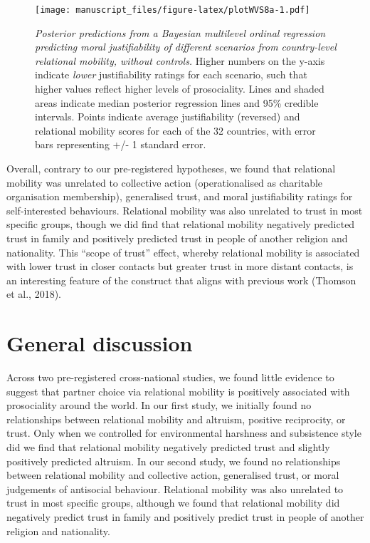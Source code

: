 \documentclass[english,man,floatsintext]{apa6}
\begin{document}
\begin{figure}
\centering
\texttt{[image: manuscript\_files/figure-latex/plotWVS8a-1.pdf]}
\caption{\label{fig:plotWVS8a}\emph{Posterior predictions from a Bayesian multilevel ordinal regression predicting moral justifiability of different scenarios from country-level relational mobility, without controls.} Higher numbers on the y-axis indicate \emph{lower} justifiability ratings for each scenario, such that higher values reflect higher levels of prosociality. Lines and shaded areas indicate median posterior regression lines and 95\% credible intervals. Points indicate average justifiability (reversed) and relational mobility scores for each of the 32 countries, with error bars representing +/- 1 standard error.}
\end{figure}

Overall, contrary to our pre-registered hypotheses, we found that relational mobility was unrelated to collective action (operationalised as charitable organisation membership), generalised trust, and moral justifiability ratings for self-interested behaviours. Relational mobility was also unrelated to trust in most specific groups, though we did find that relational mobility negatively predicted trust in family and positively predicted trust in people of another religion and nationality. This \enquote{scope of trust} effect, whereby relational mobility is associated with lower trust in closer contacts but greater trust in more distant contacts, is an interesting feature of the construct that aligns with previous work (Thomson et al., 2018).

\hypertarget{general-discussion}{%
\section{General discussion}\label{general-discussion}}

Across two pre-registered cross-national studies, we found little evidence to suggest that partner choice via relational mobility is positively associated with prosociality around the world. In our first study, we initially found no relationships between relational mobility and altruism, positive reciprocity, or trust. Only when we controlled for environmental harshness and subsistence style did we find that relational mobility negatively predicted trust and slightly positively predicted altruism. In our second study, we found no relationships between relational mobility and collective action, generalised trust, or moral judgements of antisocial behaviour. Relational mobility was also unrelated to trust in most specific groups, although we found that relational mobility did negatively predict trust in family and positively predict trust in people of another religion and nationality.
\end{document}
